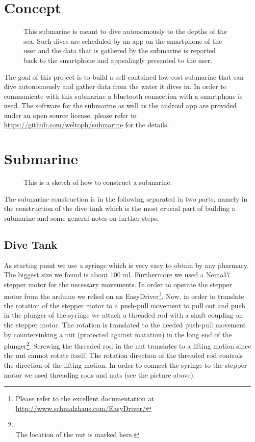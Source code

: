 \documentclass{tufte-handout}
\begin{document}
\section{Concept}
\begin{figure}
	\resizebox{\textwidth}{!}{}
	\caption{This submarine is meant to dive autonomously to the depths of the
		sea. Such dives are scheduled by an app on the smartphone of the user and
		the data that is gathered by the submarine is reported back to the
		smartphone and appealingly presented to the user.}
\end{figure}
The goal of this project is to build a self-contained low-cost submarine that
can dive autonomously and gather data from the water it dives in. In order to
communicate with this submarine a bluetooth connection with a smartphone is
used. The software for the submarine as well as the android app are provided
under an open source license, please refer to
\url{https://github.com/weltoph/submarine} for the details.
\section{Submarine}
\begin{figure}
	\resizebox{\textwidth}{!}{}
	\caption{This is a sketch of how to construct a submarine.}
\end{figure}
The submarine construction is in the following separated in two parts, namely
in the construction of the dive tank which is the most crucial part of building
a submarine and some general notes on further steps.

\subsection{Dive Tank}
As starting point we use a syringe which is very easy to obtain by any
pharmacy. The biggest size we found is about 100 ml. Furthermore we used a
Nema17 stepper motor for the necessary movements. In order to operate the
stepper motor from the arduino we relied on an EasyDriver\footnote{Please refer
to the excellent documentation at
\url{http://www.schmalzhaus.com/EasyDriver/}}.
Now, in order to translate the rotation of the stepper motor to a push-pull
movement to pull out and push in the plunger of the syringe we attach a
threaded rod with a shaft coupling on the stepper motor. The rotation is
translated to the needed push-pull movement by countersinking a nut (protected
against roatation) in the long end of the plunger\footnote{\centering
{}
\\The location of the nut is marked here.}.
Screwing the threaded rod in
the nut translates to a lifting motion since the nut cannot rotate itself. The
rotation direction of the threaded rod controls the direction of the lifting
motion. In order to connect the syringe to the stepper motor we used threading
rods and nuts (see the picture above).
\end{document}
